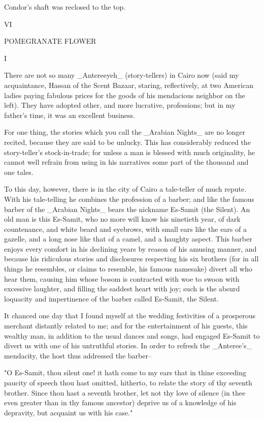 Condor's shaft was reclosed to the top.




VI

POMEGRANATE FLOWER


I

There are not so many _Antereeyeh_ (story-tellers) in Cairo now (said
my acquaintance, Hassan of the Scent Bazaar, staring, reflectively, at
two American ladies paying fabulous prices for the goods of his
mendacious neighbor on the left). They have adopted other, and more
lucrative, professions; but in my father's time, it was an excellent
business.

For one thing, the stories which you call the _Arabian Nights_ are
no longer recited, because they are said to be unlucky. This has
considerably reduced the story-teller's stock-in-trade; for unless
a man is blessed with much originality, he cannot well refrain from
using in his narratives some part of the thousand and one tales.

To this day, however, there is in the city of Cairo a tale-teller of
much repute. With his tale-telling he combines the profession of a
barber; and like the famous barber of the _Arabian Nights_ bears the
nickname Es-Samit (the Silent). An old man is this Es-Samit, who no
more will know his ninetieth year, of dark countenance, and white
beard and eyebrows, with small ears like the ears of a gazelle, and
a long nose like that of a camel, and a haughty aspect. This barber
enjoys every comfort in his declining years by reason of his amusing
manner, and because his ridiculous stories and disclosures respecting
his six brothers (for in all things he resembles, or claims to
resemble, his famous namesake) divert all who hear them, causing him
whose bosom is contracted with woe to swoon with excessive laughter,
and filling the saddest heart with joy; such is the absurd loquacity
and impertinence of the barber called Es-Samit, the Silent.

It chanced one day that I found myself at the wedding festivities of a
prosperous merchant distantly related to me; and for the entertainment
of his guests, this wealthy man, in addition to the usual dances and
songs, had engaged Es-Samit to divert us with one of his untruthful
stories. In order to refresh the _Anteree's_ mendacity, the host thus
addressed the barber--

"O Es-Samit, thou silent one! it hath come to my ears that in thine
exceeding paucity of speech thou hast omitted, hitherto, to relate the
story of thy seventh brother. Since thou hast a seventh brother, let
not thy love of silence (in thee even greater than in thy famous
ancestor) deprive us of a knowledge of his depravity, but acquaint us
with his case."

